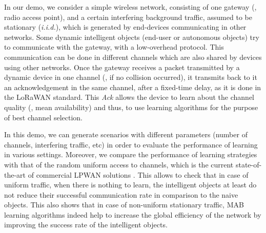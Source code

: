 In our demo, we consider a simple wireless network, consisting of one gateway (\ie, radio access point), and a certain interfering background traffic, assumed to be stationary (\emph{i.i.d.}), which is generated by end-devices communicating in other networks.
Some dynamic intelligent objects (end-user or autonomous objects) try to communicate with the gateway, with a low-overhead protocol. This communication can be done in different channels which are also shared by devices using other networks.
Once the gateway receives a packet transmitted by a dynamic device in one channel (\ie, if no collision occurred), it transmits back to it an acknowledgement in the same channel, after a fixed-time delay, as it is done in the LoRaWAN standard.
This \emph{Ack} allows the device to learn about the channel quality (\ie, mean availability) and thus, to use learning algorithms for the purpose of best channel selection.

In this demo, we can generate scenarios with different parameters (number of channels, interfering traffic, etc) in order to evaluate the performance of learning in various settings.
Moreover, we compare the performance of learning strategies with that of the random uniform access to channels, which is the current state-of-the-art of commercial LPWAN solutions \cite{Raza17}.
%
This allows to check that in case of uniform traffic, when there is nothing to learn, the intelligent objects at least do not reduce their successful communication rate in comparison to the naive objects.
This also shows that in case of non-uniform stationary traffic, MAB learning algorithms indeed help to increase the global efficiency of the network by improving the success rate of the intelligent objects.






